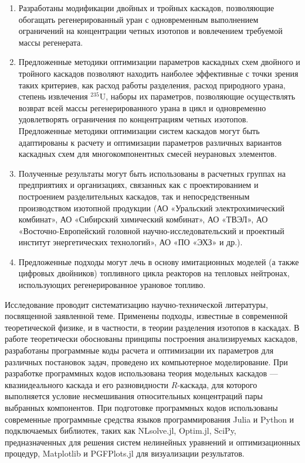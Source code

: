 {\influence} 
\begin{enumerate}
  \item Разработаны модификации двойных и тройных каскадов, позволяющие обогащать регенерированный уран с одновременным выполнением ограничений на концентрации четных изотопов и вовлечением требуемой массы регенерата.
  \item Предложенные методики оптимизации параметров каскадных схем двойного и тройного каскадов позволяют находить наиболее эффективные с точки зрения таких критериев, как расход работы разделения, расход природного урана, степень извлечения $^{235}$U, наборы их параметров, позволяющие осуществлять возврат всей массы регенерированного урана в цикл и одновременно удовлетворять ограничения по концентрациям четных изотопов. Предложенные методики оптимизации систем каскадов могут быть адаптированы к расчету и оптимизации параметров различных вариантов каскадных схем для многокомпонентных смесей неурановых элементов.
  \item Полученные результаты могут быть использованы в расчетных группах на предприятиях и организациях, связанных как с проектированием и построением разделительных каскадов, так и непосредственным производством изотопной продукции (АО «Уральский электрохимический комбинат», АО «Сибирский химический комбинат», АО «ТВЭЛ», АО «Восточно-Европейский головной научно-исследовательский и проектный институт энергетических технологий», АО «ПО «ЭХЗ» и др.).
  \item Предложенные подходы могут лечь в основу имитационных моделей (а также цифровых двойников) топливного цикла реакторов на тепловых нейтронах, использующих регенерированное урановое топливо.  
\end{enumerate}

{\methods}
Исследование проводит систематизацию научно-технической литературы, посвященной заявленной теме.
Применены подходы, известные в современной теоретической физике, и в частности, в теории разделения изотопов в каскадах.
В работе теоретически обоснованы принципы построения анализируемых каскадов, разработаны программные коды расчета и оптимизации их параметров для различных постановок задач, проведено их компьютерное моделирование.
При разработке программных кодов использована теория модельных каскадов --- квазиидеального каскада и его разновидности $R$-каскада, для которого выполняется условие несмешивания относительных концентраций пары выбранных компонентов. При подготовке программных кодов использованы современные программные средства языков программирования Julia и Python и подключаемых библиотек, таких как NLsolve.jl, Optim.jl, SciPy, предназначенных для решения систем нелинейных уравнений и оптимизационных процедур, Matplotlib и PGFPlots.jl для визуализации результатов.

